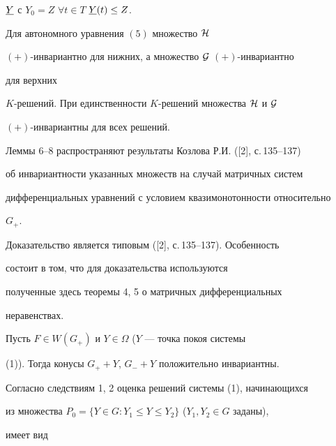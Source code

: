 {\begin{lem}
$\underline Y$ с $Y_0=Z$ $\forall t\in T$\; $\underline Y(t)\le Z$. 


\end{lem} 


 


\begin{lem} 


Для автономного уравнения $(5)$ множество $\cal H$\; 


$(+)$-инвариантно для нижних, а множество $\cal G$\; $(+)$-инвариантно 


для верхних 


$K$-решений. При единственности $K$-решений множества $\cal H$ и $\cal 


G$\; 


$(+)$-инвариантны для всех решений. 


\end{lem} 


 


Леммы 6--8 распространяют результаты Козлова Р.И. ([2], с.\,135--137) 


об инвариантности указанных множеств на случай матричных систем 


дифференциальных уравнений с условием квазимонотонности относительно 


$G_+$. 


Доказательство является типовым ([2], с.\,135--137). Особенность 


состоит в том, что для доказательства используются 


полученные здесь теоремы 4, 5 о матричных дифференциальных 


неравенствах. 


 


\begin{cor} 


Пусть $F\in W(G_+)$ и $Y\in\Omega$ ($Y$ --- точка покоя системы 


(1)). Тогда конусы $G_++Y$, $G_-+Y$ положительно инвариантны. 


\end{cor} 


 


Согласно следствиям 1, 2 оценка решений системы (1), начинающихся 


из множества $P_0=\{Y\in G:Y_1\le Y\le Y_2\}$ ($Y_1,Y_2\in G$ заданы), 


имеет вид 


}
